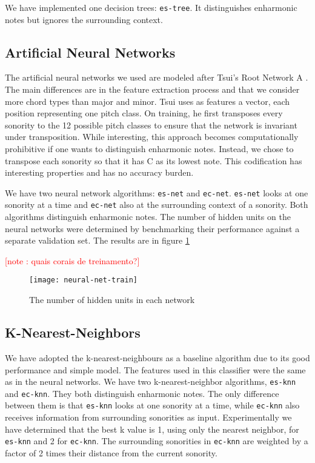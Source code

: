 \documentclass{article}
\newcounter{notecounter}
\newcommand{\note}[1]{
  \addtocounter{notecounter}{1}
  \textcolor{red}{[note \arabic{notecounter}: #1]}
}
\begin{document}
We have implemented one decision trees: \texttt{es-tree}. It
distinguishes enharmonic notes but ignores the surrounding context.

\subsection{Artificial Neural Networks}
\label{sec:neural-net}


The artificial neural networks we used are modeled after Tsui's Root
Network A \cite{tsui:harmonic}. The main differences are in the
feature extraction process and that we consider more chord types than
major and minor. Tsui uses as features a vector, each position
representing one pitch class. On training, he first transposes every
sonority to the 12 possible pitch classes to ensure that the network
is invariant under transposition. While interesting, this approach
becomes computationally prohibitive if one wants to distinguish
enharmonic notes. Instead, we chose to transpose each sonority so that
it has C as its lowest note. This codification has interesting
properties and has no accuracy burden.

We have two neural network algorithms: \texttt{es-net} and
\texttt{ec-net}.  \texttt{es-net} looks at one sonority at a time and
\texttt{ec-net} also at the surrounding context of a sonority. Both
algorithms distinguish enharmonic notes. The number of hidden units on
the neural networks were determined by benchmarking their performance
against a separate validation set. The results are in figure
\ref{fig:hidden-units} \note{quais corais de treinamento?}

\begin{figure}
  \centering
  \texttt{[image: neural-net-train]}
  \caption{The number of hidden units in each network}
  \label{fig:hidden-units}
\end{figure}


\subsection{K-Nearest-Neighbors}
\label{sec:knn}

We have adopted the k-nearest-neighbours as a baseline algorithm due
to its good performance \cite{fix.ea:important, gomez.ea:estimating}
and simple model. The features used in this classifier were the same
as in the neural networks. We have two k-nearest-neighbor algorithms,
\texttt{es-knn} and \texttt{ec-knn}. They both distinguish enharmonic
notes. The only difference between them is that \texttt{es-knn} looks
at one sonority at a time, while \texttt{ec-knn} also receives
information from surrounding sonorities as input. Experimentally we
have determined that the best k value is 1, using only the nearest
neighbor, for \texttt{es-knn} and 2 for \texttt{ec-knn}. The
surrounding sonorities in \texttt{ec-knn} are weighted by a factor of
2 times their distance from the current sonority.
\end{document}
